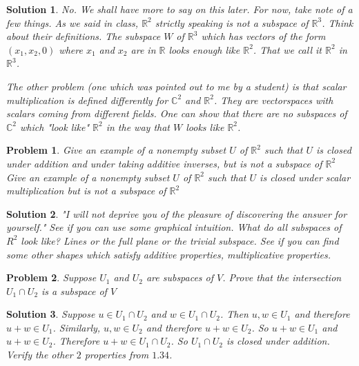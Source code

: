 \documentclass{article}
\theoremstyle{problemstyle}
\newtheorem{problem}{Problem}
\theoremstyle{problemstyle}
\newtheorem{solution}{Solution}
\begin{document}
\begin{solution}
No. We shall have more to say on this later. For now, take note of a few things. As we said in class, $\mathbb{R}^2$ strictly speaking is not a subspace of $\mathbb{R}^3$. Think about their definitions. The subspace $W$ of $\mathbb{R}^3$ which has vectors of the form $(x_1,x_2,0)$ where $x_1$ and $x_2$ are in $\mathbb{R}$ looks enough like $\mathbb{R}^2$. That we call it $\mathbb{R}^2$ in $\mathbb{R}^3$. 

The other problem (one which was pointed out to me by a student) is that scalar multiplication is defined differently for $\mathbb{C}^2$ and $\mathbb{R}^2$. They are vectorspaces with scalars coming from different fields. One can show that there are no subspaces of $\mathbb{C}^2$ which "look like" $\mathbb{R}^2$ in the way that $W$ looks like $\mathbb{R}^2$. 
\end{solution}

\begin{problem}
Give an example of a nonempty subset $U$ of $\mathbb{R}^2$ such that $U$ is closed under addition and under taking additive inverses, but is not a subspace of $\mathbb{R}^2$\\

Give an example of a nonempty subset $U$ of $\mathbb{R}^2$ such that $U$ is closed under scalar multiplication but is not a subspace of $\mathbb{R}^2$
\end{problem}

\begin{solution}
"I will not deprive you of the pleasure of discovering the answer for yourself." See if you can use some graphical intuition. What do all subspaces of $R^2$ look like? Lines or the full plane or the trivial subspace. See if you can find some other shapes which satisfy additive properties, multiplicative properties. 
\end{solution}

\begin{problem}
Suppose $U_1$ and $U_2$ are subspaces of $V$. Prove that the intersection $U_1 \cap U_2$ is a subspace of $V$
\end{problem}

\begin{solution}
Suppose $u \in U_1 \cap U_2$ and $w \in U_1 \cap U_2$. Then $u,w \in U_1$ and therefore $u+w \in U_1$. Similarly, $u,w \in U_2$ and therefore $u+w \in U_2$. So $u+w \in U_1$ and $u+w \in U_2$. Therefore $u+w \in U_1 \cap U_2$. So $U_1 \cap U_2$ is closed under addition. Verify the other $2$ properties from $1.34$. 
\end{solution}
\end{document}
